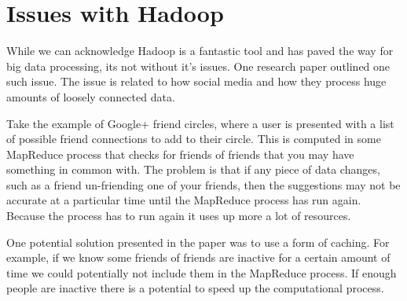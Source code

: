 \section{Issues with Hadoop}

While we can acknowledge Hadoop is a fantastic tool and has paved the way for big data processing, its not without it's issues. One research paper outlined one such issue\cite[pg.3]{hadoop-issues}. The issue is related to how social media and how they process huge amounts of loosely connected data. 

Take the example of Google+ friend circles, where a user is presented with a list of possible friend connections to add to their circle. This is computed in some MapReduce process that checks for friends of friends that you may have something in common with. The problem is that if any piece of data changes, such as a friend un-friending one of your friends, then the suggestions may not be accurate at a particular time until the MapReduce process has run again. Because the process has to run again it uses up more a lot of resources. 

One potential solution presented in the paper was to use a form of caching\cite[pg.3-4]{hadoop-issues}. For example, if we know some friends of friends are inactive for a certain amount of time we could potentially not include them in the MapReduce process. If enough people are inactive there is a potential to speed up the computational process.
